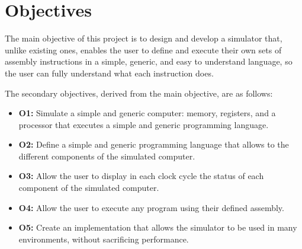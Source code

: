 \section{Objectives}\label{sec:objectives}
The main objective of this project is to design and develop a simulator that, unlike existing ones, enables the user to define and execute their own sets of \gls{assembly} instructions in a simple, generic, and easy to understand language, so the user can fully understand what each instruction does.

\noindent
The secondary objectives, derived from the main objective, are as follows:
\begin{itemize}
  \item \textbf{O1:} Simulate a simple and generic \gls{computer}: \gls{memory}, \glspl{register}, and a \gls{processor} that executes a simple and generic \gls{programming language}.
  \item \textbf{O2:} Define a simple and generic \gls{programming language} that allows to  the different components of the simulated \gls{computer}.
  \item \textbf{O3:} Allow the user to display in each \gls{clock cycle} the status of each component of the simulated
  \gls{computer}.
  \item \textbf{O4:} Allow the user to execute any program using their defined \gls{assembly}.
  \item \textbf{O5:} Create an implementation that allows the simulator to be used in many environments, without sacrificing performance.
\end{itemize}




